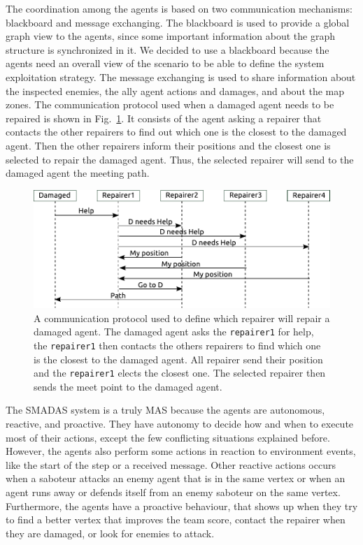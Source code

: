 The coordination among the agents is based on two communication mechanisms: blackboard and message exchanging. The blackboard is used to provide a global graph view to the agents, since some important information about the graph structure is synchronized in it. We decided to use a blackboard because the agents need an overall view of the scenario to be able to define the system exploitation strategy. The message exchanging is used to share information about the inspected enemies, the ally agent actions and damages, and about the map zones. The communication protocol used when a damaged agent needs to be repaired is shown in Fig.~\ref{fig:protocol}. It consists of the agent asking a repairer that contacts the other repairers to find out which one is the closest to the damaged agent. Then the other repairers inform their positions and the closest one is selected to repair the damaged agent. Thus, the selected repairer will send to the damaged agent the meeting path. 


\begin{figure}
\centering 
 \includegraphics [width=0.9\linewidth] {./protocolo.pdf}
\caption{A communication protocol used to define which repairer will repair a damaged agent. The damaged agent asks the \texttt{repairer1} for help, the \texttt{repairer1} then contacts the others repairers to find which one is the closest to the damaged agent. All repairer send their position and the \texttt{repairer1} elects the closest one. The selected repairer then sends the meet point to the damaged agent.}
\label{fig:protocol}	
\end{figure}

The SMADAS system is a truly MAS because the agents are autonomous, reactive, and proactive. They have autonomy to decide how and when to execute most of their actions, except the few conflicting situations explained before. However, the agents also perform some actions in reaction to environment events, like the start of the step or a received message. Other reactive actions occurs when a saboteur attacks an enemy agent that is in the same vertex or when an agent runs away or defends itself from an enemy saboteur on the same vertex. Furthermore, the agents have a proactive behaviour, that shows up when they try to find a better vertex that improves the team score, contact the repairer when they are damaged, or look for enemies to attack. 

